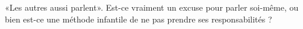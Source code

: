 
\begin{exercice}\label{exosmath-0455}

    «Les autres aussi parlent». Est-ce vraiment un excuse pour parler soi-même, ou bien est-ce une méthode infantile de ne pas prendre ses responsabilités ?

\end{exercice}
